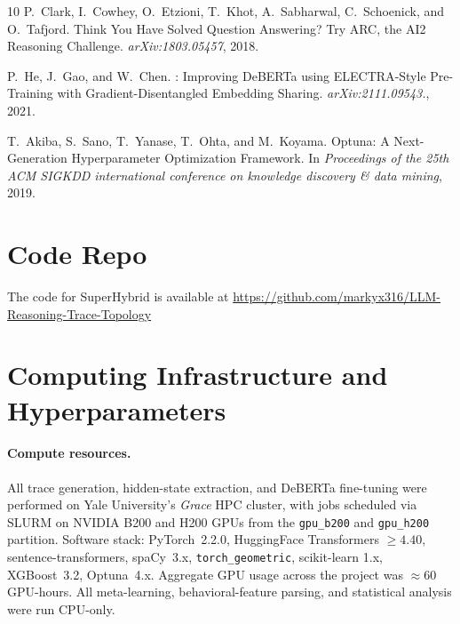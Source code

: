 \documentclass{article}
\begin{document}
\begin{thebibliography}{10}
P.~Clark, I.~Cowhey, O.~Etzioni, T.~Khot, A.~Sabharwal, C.~Schoenick, and
  O.~Tafjord.
\newblock Think You Have Solved Question Answering? Try {ARC}, the {AI2}
  Reasoning Challenge.
\newblock \emph{arXiv:1803.05457}, 2018.

P.~He, J.~Gao, and W.~Chen.
: Improving {DeBERTa} using {ELECTRA}-Style Pre-Training
  with Gradient-Disentangled Embedding Sharing.
\newblock \emph{arXiv:2111.09543.}, 2021.

T.~Akiba, S.~Sano, T.~Yanase, T.~Ohta, and M.~Koyama.
\newblock Optuna: A Next-Generation Hyperparameter Optimization Framework.
\newblock In \emph{Proceedings of the 25th ACM SIGKDD international conference on knowledge discovery \& data mining}, 2019.

\end{thebibliography}


\appendix

\section{Code Repo}

The code for SuperHybrid is available at \url{https://github.com/markyx316/LLM-Reasoning-Trace-Topology}

\section{Computing Infrastructure and Hyperparameters}
\label{app:hyper}

\paragraph{Compute resources.} All trace generation, hidden-state
extraction, and DeBERTa fine-tuning were performed on Yale University's
\emph{Grace} HPC cluster, with jobs scheduled via SLURM on NVIDIA B200 and H200 GPUs from the \texttt{gpu\_b200} and \texttt{gpu\_h200} partition. Software
stack: PyTorch~2.2.0, HuggingFace Transformers $\ge 4.40$,
sentence-transformers, spaCy~3.x, \texttt{torch\_geometric}, scikit-learn
1.x, XGBoost~3.2, Optuna~4.x. Aggregate GPU usage across the project was
$\approx 60$ GPU-hours. All meta-learning, behavioral-feature parsing, and
statistical analysis were run CPU-only.
\end{document}
